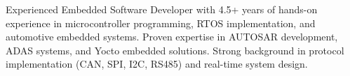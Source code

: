 

\begin{cvparagraph}

Experienced Embedded Software Developer with 4.5+ years  of hands-on experience in microcontroller programming, RTOS implementation, and automotive embedded systems. Proven expertise in AUTOSAR development, ADAS systems, and Yocto embedded solutions. Strong background in protocol implementation (CAN, SPI, I2C, RS485) and real-time system design.
\end{cvparagraph}
